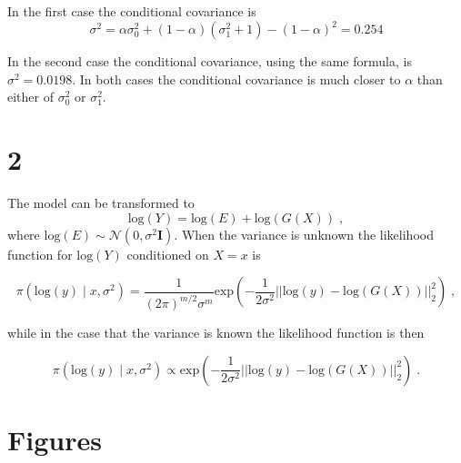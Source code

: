 \documentclass[11pt]{article}
\begin{document}
In the first case the conditional covariance is
$$\sigma^2 = \alpha \sigma_0^2 + (1-\alpha)(\sigma_1^2 + 1) - (1-\alpha)^2 = 0.254$$

In the second case the conditional covariance, using the same formula, is  $\sigma^2 = 0.0198$. In both cases the conditional covariance is much closer to $\alpha$ than either of $\sigma_0^2$ or $\sigma_1^2$.

\section*{2}

The model can be transformed to $$\text{log}(Y) = \text{log}(E) + \text{log}(G(X)) \; ,$$
where $\text{log}(E) \sim \mathcal{N}(0,\sigma^2 \textbf{I})$. When the variance is unknown the likelihood function for $\text{log}(Y)$ conditioned on $X = x$ is 

$$\pi(\text{log}(y) \; | \; x, \sigma^2) = \frac{1}{(2\pi)^{m/2}\sigma^m}\text{exp}\left(-\frac{1}{2\sigma^2} ||\text{log}(y) - \text{log}(G(X))||_2^2\right)\;,$$

while in the case that the variance is known the likelihood function is then

$$\pi(\text{log}(y) \; | \; x, \sigma^2) \propto \text{exp}\left(-\frac{1}{2\sigma^2} ||\text{log}(y) - \text{log}(G(X))||_2^2\right)\;.$$
\newpage
\section*{Figures}
\end{document}
